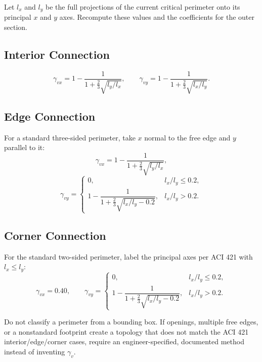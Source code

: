 \documentclass[10pt]{article}
\begin{document}
Let $l_x$ and $l_y$ be the full projections of the current critical perimeter
onto its principal $x$ and $y$ axes. Recompute these values and the coefficients
for the outer section.

\subsection{Interior Connection}
\begin{equation}
\gamma_{vx}=1-\frac{1}{1+\frac{2}{3}\sqrt{l_y/l_x}},\qquad
\gamma_{vy}=1-\frac{1}{1+\frac{2}{3}\sqrt{l_x/l_y}}.
\end{equation}

\subsection{Edge Connection}

For a standard three-sided perimeter, take $x$ normal to the free edge and $y$
parallel to it:
\begin{equation}
\gamma_{vx}=1-\frac{1}{1+\frac{2}{3}\sqrt{l_y/l_x}},
\end{equation}
\begin{equation}
\gamma_{vy}=
\begin{cases}
0, & l_x/l_y\leq0.2,\\[2pt]
1-\dfrac{1}{1+\frac{2}{3}\sqrt{l_x/l_y-0.2}}, & l_x/l_y>0.2.
\end{cases}
\end{equation}

\subsection{Corner Connection}

For the standard two-sided perimeter, label the principal axes per ACI 421 with
$l_x\leq l_y$:
\begin{equation}
\gamma_{vx}=0.40,\qquad
\gamma_{vy}=
\begin{cases}
0, & l_x/l_y\leq0.2,\\[2pt]
1-\dfrac{1}{1+\frac{2}{3}\sqrt{l_x/l_y-0.2}}, & l_x/l_y>0.2.
\end{cases}
\end{equation}

Do not classify a perimeter from a bounding box. If openings, multiple free
edges, or a nonstandard footprint create a topology that does not match the
ACI 421 interior/edge/corner cases, require an engineer-specified, documented
method instead of inventing $\gamma_v$.
\end{document}
